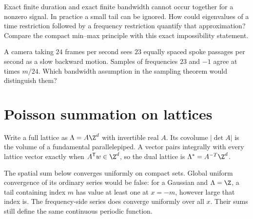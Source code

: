 \begin{think}
Exact finite duration and exact finite bandwidth cannot occur together for a nonzero signal. In practice a small tail can be ignored. How could eigenvalues of a time restriction followed by a frequency restriction quantify that approximation? Compare the compact min--max principle with this exact impossibility statement.
\end{think}
\begin{think}
A camera taking $24$ frames per second sees $23$ equally spaced spoke passages per second as a slow backward motion. Samples of frequencies $23$ and $-1$ agree at times $m/24$. Which bandwidth assumption in the sampling theorem would distinguish them?
\end{think}

\section{Poisson summation on lattices}

Write a full lattice as $\Lambda=A\Z^d$ with invertible real $A$. Its covolume $|\det A|$ is the volume of a fundamental parallelepiped. A vector pairs integrally with every lattice vector exactly when $A^{\mathsf T}w\in\Z^d$, so the dual lattice is $\Lambda^*=A^{-T}\Z^d$.

The spatial sum below converges uniformly on compact sets. Global uniform convergence of its ordinary series would be false: for a Gaussian and $\Lambda=\Z$, a tail containing index $m$ has value at least one at $x=-m$, however large that index is. The frequency-side series does converge uniformly over all $x$. Their sums still define the same continuous periodic function.

